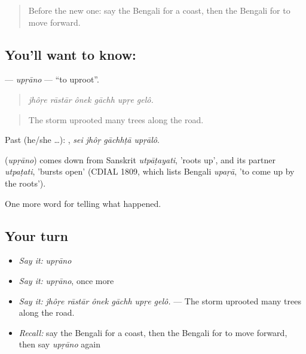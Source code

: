 \label{lesson:BN-C288-uprano}



\begin{quote}
Before the new one: say the Bengali for a coast, then the Bengali for to move forward.
\end{quote}

\subsection*{You'll want to know: }
\textbf{} — \emph{upṛāno} — \textquotedblleft{}to uproot\textquotedblright{}.

\begin{quote}
     
\end{quote}

\begin{quote}
\emph{jhôṛe rāstār ônek gāchh upṛe gelô.}
\end{quote}

\begin{quote}
The storm uprooted many trees along the road.
\end{quote}

Past (he/she …):    , \emph{sei jhôṛ gāchhṭā upṛālô}.

\begin{cousinweb}
\textbf{} (\emph{upṛāno}) comes down from Sanskrit \emph{utpāṭayati}, 'roots up', and its partner \emph{utpaṭati}, 'bursts open' (CDIAL 1809, which lists Bengali \emph{upaṛā}, 'to come up by the roots').
\end{cousinweb}

\begin{grammarlens}[title={What you've built}]
One more word for telling what happened.
\end{grammarlens}

\subsection*{Your turn}
\begin{itemize}
\raggedright
  \item \emph{Say it:} \emph{upṛāno}
  \item \emph{Say it:} \emph{upṛāno}, once more
  \item \emph{Say it:} \emph{jhôṛe rāstār ônek gāchh upṛe gelô.} — The storm uprooted many trees along the road.
  \item \emph{Recall:} say the Bengali for a coast, then the Bengali for to move forward, then say \emph{upṛāno} again
\end{itemize}

